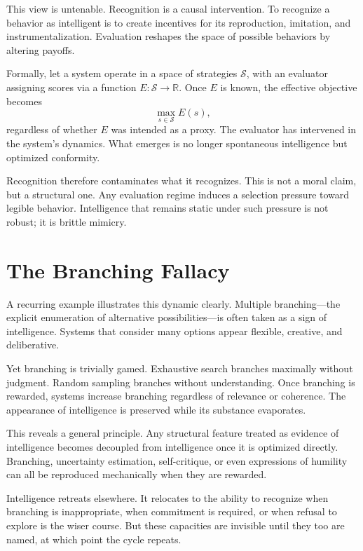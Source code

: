 \documentclass[12pt]{article}
\begin{document}
This view is untenable. Recognition is a causal intervention. To recognize a behavior as intelligent is to create incentives for its reproduction, imitation, and instrumentalization. Evaluation reshapes the space of possible behaviors by altering payoffs.

Formally, let a system operate in a space of strategies $\mathcal{S}$, with an evaluator assigning scores via a function $E : \mathcal{S} \to \mathbb{R}$. Once $E$ is known, the effective objective becomes
\[
\max_{s \in \mathcal{S}} E(s),
\]
regardless of whether $E$ was intended as a proxy. The evaluator has intervened in the system’s dynamics. What emerges is no longer spontaneous intelligence but optimized conformity.

Recognition therefore contaminates what it recognizes. This is not a moral claim, but a structural one. Any evaluation regime induces a selection pressure toward legible behavior. Intelligence that remains static under such pressure is not robust; it is brittle mimicry.

\section{The Branching Fallacy}

A recurring example illustrates this dynamic clearly. Multiple branching---the explicit enumeration of alternative possibilities---is often taken as a sign of intelligence. Systems that consider many options appear flexible, creative, and deliberative.

Yet branching is trivially gamed. Exhaustive search branches maximally without judgment. Random sampling branches without understanding. Once branching is rewarded, systems increase branching regardless of relevance or coherence. The appearance of intelligence is preserved while its substance evaporates.

This reveals a general principle. Any structural feature treated as evidence of intelligence becomes decoupled from intelligence once it is optimized directly. Branching, uncertainty estimation, self-critique, or even expressions of humility can all be reproduced mechanically when they are rewarded.

Intelligence retreats elsewhere. It relocates to the ability to recognize when branching is inappropriate, when commitment is required, or when refusal to explore is the wiser course. But these capacities are invisible until they too are named, at which point the cycle repeats.
\end{document}
